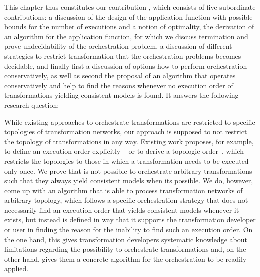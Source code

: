 This chapter thus constitutes our contribution , which consists of five subordinate contributions:
a discussion of the design of the application function with possible bounds for the number of executions and a notion of optimality, the derivation of an algorithm for the application function, for which we discuss termination and prove undecidability of the orchestration problem, a discussion of different strategies to restrict transformation that the orchestration problems becomes decidable, and finally first a discussion of options how to perform orchestration conservatively, as well as second the proposal of an algorithm that operates conservatively and help to find the reasons whenever no execution order of transformations yielding consistent models is found.
It answers the following research question:


While existing approaches to orchestrate transformations are restricted to specific topologies of transformation networks, our approach is supposed to not restrict the topology of transformations in any way.
Existing work proposes, for example, to define an execution order explicitly ~\cite{pilgrim2008a, vanhooff2007UniTI-MODELS} or to derive a topologic order~\cite{stevens2020BidirectionalTransformationLarge-SoSym}, which restricts the topologies to those in which a transformation needs to be executed only once.
We prove that is not possible to orchestrate arbitrary transformations such that they always yield consistent models when its possible.
We do, however, come up with an algorithm that is able to process transformation networks of arbitrary topology, which follows a specific orchestration strategy that does not necessarily find an execution order that yields consistent models whenever it exists, but instead is defined in way that it supports the transformation developer or user in finding the reason for the inability to find such an execution order.
On the one hand, this gives transformation developers systematic knowledge about limitations regarding the possibility to orchestrate transformations and, on the other hand, gives them a concrete algorithm for the orchestration to be readily applied.

